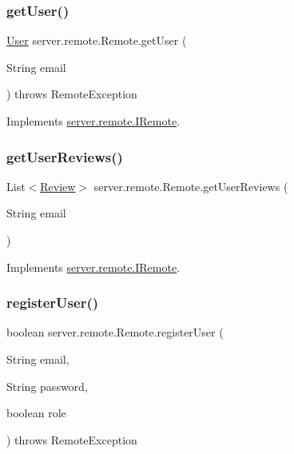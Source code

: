 \subsubsection{\texorpdfstring{get\+User()}{getUser()}}
{\footnotesize\ttfamily \hyperlink{classserver_1_1data_1_1_user}{User} server.\+remote.\+Remote.\+get\+User (\begin{DoxyParamCaption}\item[{String}]{email }\end{DoxyParamCaption}) throws Remote\+Exception}



Implements \hyperlink{interfaceserver_1_1remote_1_1_i_remote_ab741cf58a7e2b18ba36069d14d9d04ef}{server.\+remote.\+I\+Remote}.

\mbox{\label{classserver_1_1remote_1_1_remote_a396c96a6b8802c2b4658ecccd37e84db}} 
\subsubsection{\texorpdfstring{get\+User\+Reviews()}{getUserReviews()}}
{\footnotesize\ttfamily List$<$\hyperlink{classserver_1_1data_1_1_review}{Review}$>$ server.\+remote.\+Remote.\+get\+User\+Reviews (\begin{DoxyParamCaption}\item[{String}]{email }\end{DoxyParamCaption})}



Implements \hyperlink{interfaceserver_1_1remote_1_1_i_remote_a9e52d282ba2386018ebd6817459a743f}{server.\+remote.\+I\+Remote}.

\mbox{\label{classserver_1_1remote_1_1_remote_ad3a381123e93a8e5ec26d84c4ff8b92f}} 
\subsubsection{\texorpdfstring{register\+User()}{registerUser()}}
{\footnotesize\ttfamily boolean server.\+remote.\+Remote.\+register\+User (\begin{DoxyParamCaption}\item[{String}]{email,  }\item[{String}]{password,  }\item[{boolean}]{role }\end{DoxyParamCaption}) throws Remote\+Exception}



